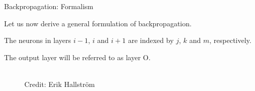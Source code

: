 \begin{frame} {Backpropagation: Formalism}
  \begin{itemize}
    \item \small{Let us now derive a general formulation of backpropagation.}
    \item \small{The neurons in layers $i-1$, $i$ and $i+1$ are indexed by $j$, $k$ and $m$, respectively.
    \item The output layer will be referred to as layer O.}
   \begin{figure}
    \centering
      \tiny{\\Credit: Erik Hallstr\"{o}m}
    \end{figure}
  \end{itemize}
\end{frame}

